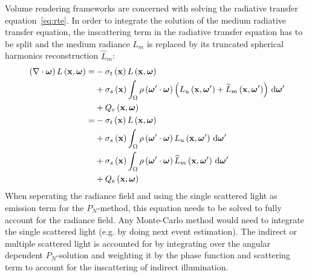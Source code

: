 Volume rendering frameworks are concerned with solving the radiative transfer equation~\ref{eq:rte}. In order to integrate the solution of the medium radiative transfer equation, the inscattering term in the radiative transfer equation has to be split and the medium radiance $L_m$ is replaced by its truncated spherical harmonics reconstruction $\widehat{L}_m$:
\begin{align}
\left(\nabla\cdot\boldsymbol{\mathbf{\omega}}\right)L\left(\boldsymbol{\mathbf{x}}, \boldsymbol{\mathbf{\omega}} \right)
=&
-\sigma_t\left(\boldsymbol{\mathbf{x}}\right) L\left(\boldsymbol{\mathbf{x}}, \boldsymbol{\mathbf{\omega}} \right)\nonumber\\
&
+\sigma_s\left(\boldsymbol{\mathbf{x}}\right) \int_{\Omega}
{
\rho\left(\boldsymbol{\mathbf{\omega}}'\cdot\boldsymbol{\mathbf{\omega}}\right)\left(L_u\left(\boldsymbol{\mathbf{x}}, \boldsymbol{\mathbf{\omega}}' \right)+\widehat{L}_m\left(\boldsymbol{\mathbf{x}}, \boldsymbol{\mathbf{\omega}}' \right)\right)\,\mathrm{d}\boldsymbol{\mathbf{\omega}}'
}
\nonumber
\\
&
+Q_e\left(\boldsymbol{\mathbf{x}}, \boldsymbol{\mathbf{\omega}}\right)
\nonumber
\\
=&
-\sigma_t\left(\boldsymbol{\mathbf{x}}\right) L\left(\boldsymbol{\mathbf{x}}, \boldsymbol{\mathbf{\omega}} \right)
\nonumber\\
&
+\sigma_s\left(\boldsymbol{\mathbf{x}}\right) \int_{\Omega}
{
\rho\left(\boldsymbol{\mathbf{\omega}}'\cdot\boldsymbol{\mathbf{\omega}}\right)L_u\left(\boldsymbol{\mathbf{x}}, \boldsymbol{\mathbf{\omega}}' \right)\,\mathrm{d}\boldsymbol{\mathbf{\omega}}'
}
\nonumber\\
&
+\sigma_s\left(\boldsymbol{\mathbf{x}}\right) \int_{\Omega}
{
\rho\left(\boldsymbol{\mathbf{\omega}}'\cdot\boldsymbol{\mathbf{\omega}}\right)\widehat{L}_m\left(\boldsymbol{\mathbf{x}}, \boldsymbol{\mathbf{\omega}}' \right)\,\mathrm{d}\boldsymbol{\mathbf{\omega}}'
}
\nonumber\\
&
+Q_e\left(\boldsymbol{\mathbf{x}}, \boldsymbol{\mathbf{\omega}}\right)
\label{eq:pn_rendering_integration1}
\end{align}
When seperating the radiance field and using the single scattered light as emission term for the $P_N$-method, this equation needs to be solved to fully account for the radiance field. Any Monte-Carlo method would need to integrate the single scattered light (e.g. by doing next event estimation). The indirect or multiple scattered light is accounted for by integrating over the angular dependent $P_N$-solution and weighting it by the phase function and scattering term to account for the inscattering of indirect illumination.

